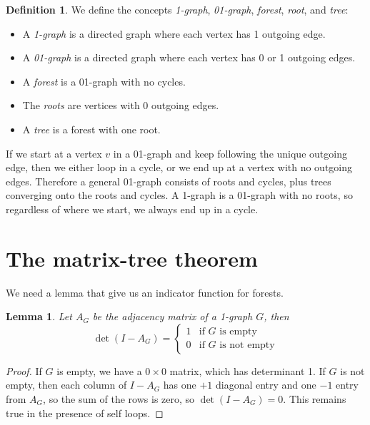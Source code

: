 \documentclass[a4paper, 11pt]{article}
\newtheorem{lemma}[theorem]{Lemma}
\theoremstyle{definition}
\newtheorem{definition}{Definition}[section]
\begin{document}
\begin{definition}
We define the concepts \emph{1-graph}, \emph{01-graph}, \emph{forest}, \emph{root}, and \emph{tree}:
 \begin{itemize}
  \item A \emph{1-graph} is a directed graph where each vertex has 1 outgoing edge.
  \item A \emph{01-graph} is a directed graph where each vertex has 0 or 1 outgoing edges.
  \item A \emph{forest} is a 01-graph with no cycles.
  \item The \emph{roots} are vertices with 0 outgoing edges.
  \item A \emph{tree} is a forest with one root.
 \end{itemize}
\end{definition}

If we start at a vertex $v$ in a 01-graph and keep following the unique outgoing edge, then we either loop in a cycle, or we end up at a vertex with no outgoing edges. Therefore a general 01-graph consists of roots and cycles, plus trees converging onto the roots and cycles. A 1-graph is a 01-graph with no roots, so regardless of where we start, we always end up in a cycle.

\section{The matrix-tree theorem}

We need a lemma that give us an indicator function for forests.

\begin{lemma}
  Let $A_G$ be the adjacency matrix of a 1-graph $G$, then
  \[
    \det(I - A_G) = \begin{cases}
      1 & \text{if $G$ is empty} \\
      0 & \text{if $G$ is not empty}
    \end{cases}
  \]
\end{lemma}
\begin{proof}
  If $G$ is empty, we have a $0\times 0$ matrix, which has determinant 1.
  If $G$ is not empty, then each column of $I - A_G$ has one $+1$ diagonal entry and one $-1$ entry from $A_G$, so the sum of the rows is zero, so $\det(I - A_G) = 0$. This remains true in the presence of self loops.
\end{proof}
\end{document}
